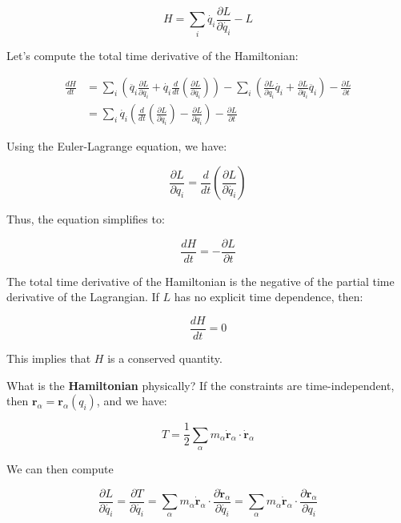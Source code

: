 \begin{equation}
    H=\sum_i \dot{q_i} \frac{\partial L}{\partial \dot{q_i}} - L
\end{equation}

Let's compute the total time derivative of the Hamiltonian:

\begin{align*}
   \frac{dH}{dt}&=\sum_i \left(\ddot{q_i} \frac{\partial L}{\partial \dot{q_i}} + \dot{q_i} \frac{d}{dt} \left(\frac{\partial L}{\partial \dot{q_i}}\right)\right) - \sum_i \left(\frac{\partial L}{\partial q_i} \dot{q_i} + \frac{\partial L}{\partial \dot{q_i}} \ddot{q_i} \right) - \frac{\partial L}{\partial t}\\
   &=\sum_i\dot{q_i}\left(\frac{d}{dt} \left(\frac{\partial L}{\partial \dot{q_i}}\right)-\frac{\partial L}{\partial q_i}\right)-\frac{\partial L}{\partial t}
\end{align*}

Using the Euler-Lagrange equation, we have:

\begin{equation}
    \frac{\partial L}{\partial q_i}=\frac{d}{dt} \left(\frac{\partial L}{\partial \dot{q_i}}\right)
\end{equation}

Thus, the equation simplifies to:

\begin{equation}
    \frac{dH}{dt}=-\frac{\partial L}{\partial t}
\end{equation}

The total time derivative of the Hamiltonian is the negative of the partial time 
derivative of the Lagrangian. If $L$ has no explicit time dependence, then:

\begin{equation}
    \frac{dH}{dt}=0
\end{equation}

This implies that $H$ is a conserved quantity.

What is the \textbf{Hamiltonian} physically? If the constraints are time-independent, then $\mathbf{r}_\alpha = \mathbf{r}_\alpha(q_i)$, and we have:

\begin{equation}
    T=\frac{1}{2} \sum_\alpha m_\alpha \dot{\mathbf{r}}_\alpha \cdot \dot{\mathbf{r}}_\alpha
\end{equation}

We can then compute

\begin{equation}
    \frac{\partial L}{\partial \dot{q_i}} = \frac{\partial T}{\partial \dot{q_i}} = \sum_\alpha m_\alpha \dot{\mathbf{r}}_\alpha \cdot \frac{\partial \dot{\mathbf{r}}_\alpha}{\partial \dot{q_i}} = \sum_\alpha m_\alpha \dot{\mathbf{r}}_\alpha \cdot \frac{\partial \mathbf{r}_\alpha}{\partial q_i}
\end{equation}

